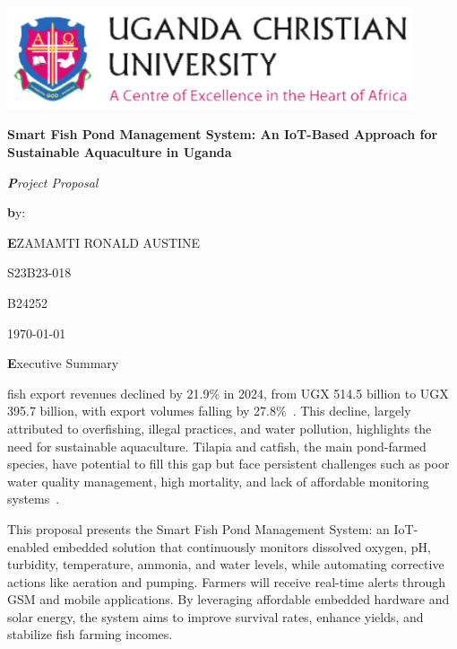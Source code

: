 \documentclass[12pt,a4paper]{report}
\begin{document}
\begin{titlepage}
    \centering
    \includegraphics[width=0.9\textwidth]{img/UCU.png}\\
    \vspace*{2cm}
    {\Huge\bfseries Smart Fish Pond Management System: An IoT-Based Approach for Sustainable Aquaculture in Uganda \par}
    \vspace{2cm}
    {\LARGE\itshape\textbf Project Proposal\par}
    \vspace{2cm}
    {\Large\textbf by:\par}
    \vspace{1cm}
    {\Large\textbf EZAMAMTI RONALD AUSTINE \par}
    \vspace{0.5cm}
    {\large S23B23-018\par}
    \vspace{0.5cm}
    {\large B24252\par}
    \vspace{1.5cm}
    {\large \today\par}
\end{titlepage}

\begin{center}
    {\LARGE\textbf Executive Summary}
\end{center}
\noindent
fish export revenues declined by 21.9\% in 2024, from UGX 514.5 billion to UGX 395.7 billion, with export volumes falling by 27.8\%~\cite{bankuganda2025}. This decline, largely attributed to overfishing, illegal practices, and water pollution, highlights the need for sustainable aquaculture. Tilapia and catfish, the main pond-farmed species, have potential to fill this gap but face persistent challenges such as poor water quality management, high mortality, and lack of affordable monitoring systems~\cite{tumwesigye2022effect, byabasaija2025unlocking}.

This proposal presents the Smart Fish Pond Management System: an IoT-enabled embedded solution that continuously monitors dissolved oxygen, pH, turbidity, temperature, ammonia, and water levels, while automating corrective actions like aeration and pumping. Farmers will receive real-time alerts through GSM and mobile applications. By leveraging affordable embedded hardware and solar energy, the system aims to improve survival rates, enhance yields, and stabilize fish farming incomes.  
\end{document}
